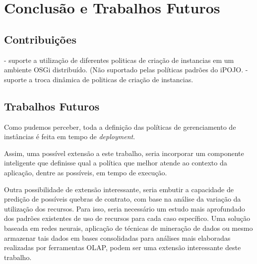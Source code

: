 \chapter{Conclusão e Trabalhos Futuros}
\label{ch:5}

\section{Contribuições}

- suporte a utilização de diferentes politicas de criação de instancias em um ambiente OSGi distribuído. (Não suportado pelas políticas padrões do iPOJO.
- suporte a troca dinâmica de politicas de criação de instancias.


\section{Trabalhos Futuros}
Como pudemos perceber, toda a definição das políticas de gerenciamento de instâncias é feita em tempo de \textit{deployment}. 

Assim, uma possível extensão a este trabalho, seria incorporar um componente inteligente que definisse qual a política que melhor atende ao contexto da aplicação, dentre as possíveis, em tempo de execução.

Outra possibilidade de extensão interessante, seria embutir a capacidade de predição de possíveis quebras de contrato, com base na análise da variação da utilização dos recursos. Para isso, seria necessário um estudo mais aprofundado dos padrões existentes de uso de recursos para cada caso específico. Uma solução baseada em redes neurais, aplicação de técnicas de mineração de dados ou mesmo armazenar tais dados em bases consolidadas para análises mais elaboradas realizadas por ferramentas OLAP, podem ser uma extensão interessante deste trabalho.